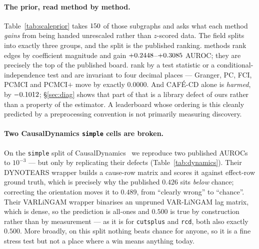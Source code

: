 \documentclass[10pt,twocolumn]{article}
\newcommand{\cafe}{CAF\'E}
\DeclareRobustCommand{\cd}{\cafe{}\nobreakdash-CD}
\begin{document}


\paragraph{The prior, read method by method.} Table~\ref{tab:scaleprior} takes
$150$ of those subgraphs and asks what each method \emph{gains} from being handed
unrescaled rather than $z$-scored data. The field splits into exactly three groups, and
the split is the published ranking. \SPngain{} methods rank edges by coefficient
magnitude and gain $+0.2448$--$+0.3085$ AUROC; they are precisely the top of the published
board. \SPnflat{} rank by a test statistic or a conditional-independence test and are
invariant to four decimal places --- Granger, PC, FCI, PCMCI and PCMCI$+$ move by exactly
$0.0000$. And \cd{} alone is \emph{harmed}, by $-0.1012$; \S\ref{sec:diag} shows that
part of that is a library defect of ours rather than a property of the estimator. A
leaderboard whose ordering is this cleanly predicted by a preprocessing convention is not
primarily measuring discovery.

\paragraph{Two CausalDynamics \texttt{simple} cells are broken.} On the
\texttt{simple} split of CausalDynamics~\cite{causaldynamics} we reproduce two
published AUROCs to $10^{-3}$ --- but only by replicating their defects
(Table~\ref{tab:dynamics}). Their DYNOTEARS wrapper builds a cause-row matrix and
scores it against effect-row ground truth, which is precisely why the published
$0.426$ sits \emph{below} chance; correcting the orientation moves it to $0.489$,
from ``clearly wrong'' to ``chance''. Their VARLiNGAM wrapper binarises an unpruned
VAR-LiNGAM lag matrix, which is dense, so the prediction is all-ones and $0.500$ is
true by construction rather than by measurement --- as it is for \texttt{cutsplus} and
\texttt{rcd}, both also exactly $0.500$. More broadly, on this split nothing beats
chance for anyone, so it is a fine stress test but not a place where a win means
anything today.


\end{document}
